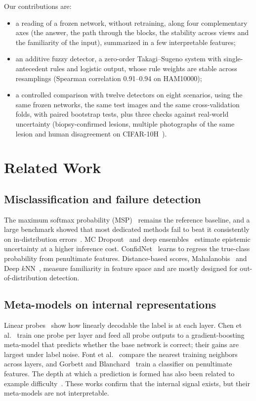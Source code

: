 Our contributions are:
\begin{itemize}
  \item a reading of a frozen network, without retraining, along four complementary axes (the answer, the path through the blocks,
        the stability across views and the familiarity of the input), summarized in a few interpretable features;
  \item an additive fuzzy detector, a zero-order Takagi--Sugeno system with single-antecedent rules and logistic output, whose rule
        weights are stable across resamplings (Spearman correlation 0.91--0.94 on HAM10000);
  \item a controlled comparison with twelve detectors on eight scenarios, using the same frozen networks, the same test images and the
        same cross-validation folds, with paired bootstrap tests, plus three checks against real-world uncertainty
        (biopsy-confirmed lesions, multiple photographs of the same lesion and human disagreement on CIFAR-10H~\cite{peterson2019}).
\end{itemize}

\section{Related Work}

\subsection{Misclassification and failure detection}
The maximum softmax probability (MSP)~\cite{hendrycks2017} remains the reference baseline, and a large benchmark showed that most
dedicated methods fail to beat it consistently on in-distribution errors~\cite{jaeger2023}. MC Dropout~\cite{gal2016} and deep
ensembles~\cite{lakshminarayanan2017} estimate epistemic uncertainty at a higher inference cost. ConfidNet~\cite{corbiere2019}
learns to regress the true-class probability from penultimate features. Distance-based scores, Mahalanobis~\cite{lee2018} and Deep
$k$NN~\cite{papernot2018}, measure familiarity in feature space and are mostly designed for out-of-distribution detection.

\subsection{Meta-models on internal representations}
Linear probes~\cite{alain2016} show how linearly decodable the label is at each layer. Chen et al.~\cite{chen2019} train one probe per
layer and feed all probe outputs to a gradient-boosting meta-model that predicts whether the base network is correct; their gains are
largest under label noise. Font et al.~\cite{font2025} compare the nearest training neighbors across layers, and Gorbett and
Blanchard~\cite{gorbett2022} train a classifier on penultimate features. The depth at which a prediction is formed has also been related
to example difficulty~\cite{baldock2021}. These works confirm that the internal signal exists, but their meta-models are not interpretable.

